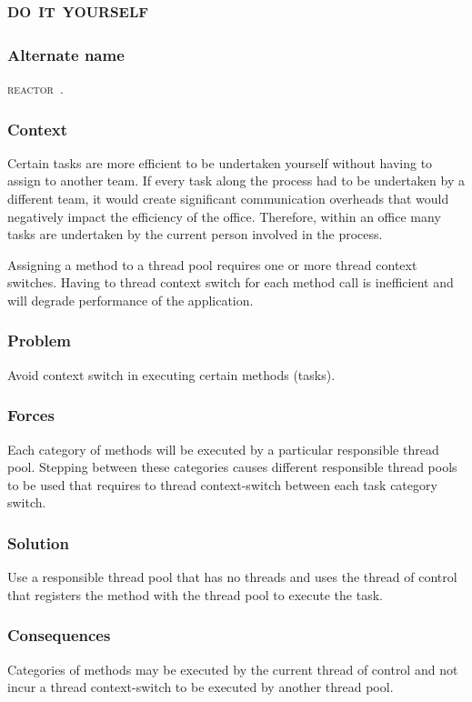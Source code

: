\documentclass[prodmode]{style/acmlarge}
\begin{document}
\subsection{\textsc{\textbf{do it yourself}}}

\subsubsection*{Alternate name} \textsc{reactor}~\cite{reactor}.

\subsubsection*{Context} Certain tasks are more efficient to be undertaken
yourself without having to assign to another team.  If every task along the
process had to be undertaken by a different team, it would create significant
communication overheads that would negatively impact the efficiency of the
office.  Therefore, within an office many tasks are undertaken by the current
person involved in the process.

Assigning a method to a thread pool requires one or more thread context
switches.  Having to thread context switch for each method call is inefficient
and will degrade performance of the application.

\subsubsection*{Problem} Avoid context switch in executing certain methods (tasks).

\subsubsection*{Forces} Each category of methods will be executed by a particular
responsible thread pool.  Stepping between these categories causes different
responsible thread pools to be used that requires to thread context-switch between
each task category switch.

\subsubsection*{Solution} Use a responsible thread pool that has no threads and
uses the thread of control that registers the method with the thread pool to
execute the task.

\subsubsection*{Consequences} Categories of methods may be executed by the
current thread of control and not incur a thread context-switch to be executed
by another thread pool.
\end{document}
